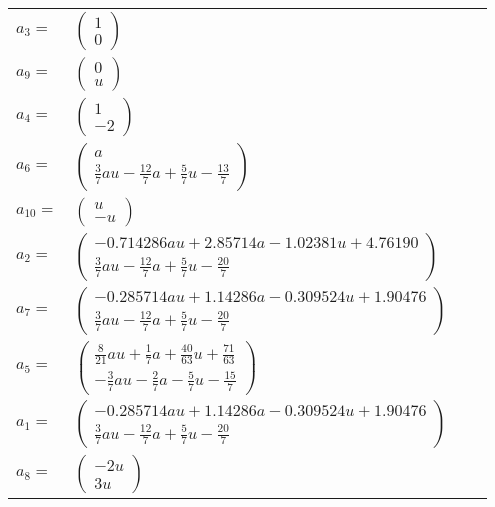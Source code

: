 \documentclass[1p]{elsarticle_modified}
\theoremstyle{definition}
\begin{document}
\begin{tabular}{m{7pt} m{180pt} m{7pt} m{180pt} }
\flushright $a_{3}=$&$\begin{pmatrix}1\\0\end{pmatrix}$ \\
\flushright $a_{9}=$&$\begin{pmatrix}0\\u\end{pmatrix}$ \\
\flushright $a_{4}=$&$\begin{pmatrix}1\\-2\end{pmatrix}$ \\
\flushright $a_{6}=$&$\begin{pmatrix}a\\\frac{3}{7} a u-\frac{12}{7} a+\frac{5}{7} u-\frac{13}{7}\end{pmatrix}$ \\
\flushright $a_{10}=$&$\begin{pmatrix}u\\- u\end{pmatrix}$ \\
\flushright $a_{2}=$&$\begin{pmatrix}-0.714286 a u+2.85714 a-1.02381 u+4.76190\\\frac{3}{7} a u-\frac{12}{7} a+\frac{5}{7} u-\frac{20}{7}\end{pmatrix}$ \\
\flushright $a_{7}=$&$\begin{pmatrix}-0.285714 a u+1.14286 a-0.309524 u+1.90476\\\frac{3}{7} a u-\frac{12}{7} a+\frac{5}{7} u-\frac{20}{7}\end{pmatrix}$ \\
\flushright $a_{5}=$&$\begin{pmatrix}\frac{8}{21} a u+\frac{1}{7} a+\frac{40}{63} u+\frac{71}{63}\\-\frac{3}{7} a u-\frac{2}{7} a-\frac{5}{7} u-\frac{15}{7}\end{pmatrix}$ \\
\flushright $a_{1}=$&$\begin{pmatrix}-0.285714 a u+1.14286 a-0.309524 u+1.90476\\\frac{3}{7} a u-\frac{12}{7} a+\frac{5}{7} u-\frac{20}{7}\end{pmatrix}$ \\
\flushright $a_{8}=$&$\begin{pmatrix}-2 u\\3 u\end{pmatrix}$ \\

\end{tabular}
\end{document}
